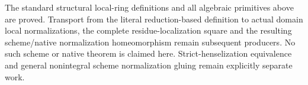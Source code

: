 \begin{remark}
The standard structural local-ring definitions and all algebraic
primitives above are proved. Transport from the literal
reduction-based definition to actual domain local normalizations,
the complete residue-localization square and the resulting
scheme/native normalization homeomorphism remain subsequent
producers. No such scheme or native theorem is claimed here.
Strict-henselization equivalence and general nonintegral scheme
normalization gluing remain explicitly separate work.
\end{remark}
